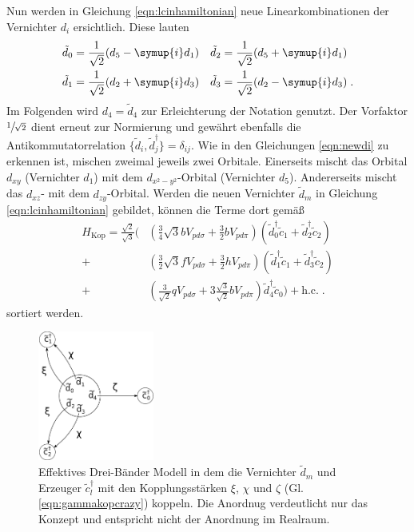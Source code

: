 Nun werden in Gleichung \eqref{eqn:lcinhamiltonian} neue Linearkombinationen der Vernichter $d_i$ ersichtlich.
Diese lauten 
\begin{equation}
    \begin{aligned}
    \tilde{d}_0 &= \frac{1}{\sqrt{2}} (d_5-\symup{i}d_1) & \tilde{d}_2 &= \frac{1}{\sqrt{2}} (d_5+\symup{i}d_1) \\
    \tilde{d}_1 &= \frac{1}{\sqrt{2}} (d_2+\symup{i}d_3) & \tilde{d}_3 &= \frac{1}{\sqrt{2}} (d_2-\symup{i}d_3) \; . \label{eqn:newdi}
    \end{aligned}
\end{equation}
Im Folgenden wird $d_4 = \tilde{d}_4$ zur Erleichterung der Notation genutzt.
Der Vorfaktor $\sfrac{1}{\sqrt{2}}$ dient erneut zur Normierung und gewährt ebenfalls die Antikommutatorrelation $\{ \tilde{d}_i, \tilde{d}^\dagger_j \} = \delta_{ij}$.
Wie in den Gleichungen \eqref{eqn:newdi} zu erkennen ist, mischen zweimal jeweils zwei Orbitale.
Einerseits mischt das Orbital $d_{xy}$ (Vernichter $d_1$) mit dem $d_{x^2-y^2}$-Orbital (Vernichter $d_5$).
Andererseits mischt das $d_{xz}$- mit dem $d_{zy}$-Orbital.
Werden die neuen Vernichter $\tilde{d}_m$ in Gleichung \eqref{eqn:lcinhamiltonian} gebildet, können die Terme dort gemäß
\begin{equation}
            \begin{split}
                H_\text{Kop} = \frac{\sqrt{2}}{\sqrt{3}}  \biggl(
                & \left ( \frac{3}{4}\sqrt{3} b V_{pd\sigma} + \frac{3}{2}  b   V_{pd\pi} \right )      \left ( \tilde{d}^\dagger_0 \tilde{c}_1 + \tilde{d}^\dagger_2 \tilde{c}_2 \right )   \\
            +    & \left ( \frac{3}{2}\sqrt{3} f V_{pd\sigma} + \frac{3}{2}  h   V_{pd\pi} \right )     \left ( \tilde{d}^\dagger_1 \tilde{c}_1 + \tilde{d}^\dagger_3 \tilde{c}_2 \right )   \\
            +    & \left ( \frac{3}{\sqrt{2}} q V_{pd\sigma} + 3 \frac{\sqrt{3}}{\sqrt{2}}  b V_{pd\pi} \right ) \tilde{d}^\dagger_4 \tilde{c}_0 \biggr) + \text{h.c.} \; .
            \end{split}
            \label{eqn:Hkopnice}
\end{equation}
sortiert werden.\\
\begin{figure}
    \centering
    \includegraphics[width = 0.34\textwidth]{Plots/3band.pdf}
    \caption{Effektives Drei-Bänder Modell in dem die
    Vernichter $\tilde{d}_m$ und Erzeuger $\tilde{c}_l^{\dagger}$ mit den Kopplungsstärken
    $\xi$, $\chi$ und $\zeta$ (Gl. \eqref{eqn:gammakopcrazy}) koppeln.
    Die Anordnug verdeutlicht nur das Konzept und entspricht nicht der 
    Anordnung im Realraum.}
    \label{fig:3band}
\end{figure}
